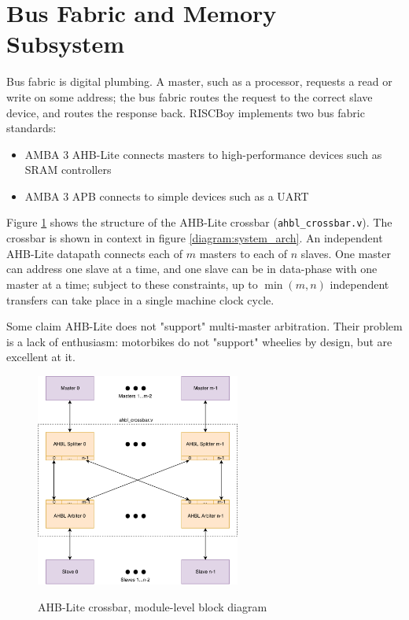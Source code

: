 \section{Bus Fabric and Memory Subsystem}

Bus fabric is digital plumbing. A master, such as a processor, requests a read or write on some address; the bus fabric routes the request to the correct slave device, and routes the response back. RISCBoy implements two bus fabric standards:

\begin{itemize}
\item AMBA 3 AHB-Lite connects masters to high-performance devices such as SRAM controllers
\item AMBA 3 APB connects to simple devices such as a UART
\end{itemize}

Figure \ref{diagram:crossbar_structure} shows the structure of the AHB-Lite crossbar ({\tt ahbl\_crossbar.v}). The crossbar is shown in context in figure \ref{diagram:system_arch}. An independent AHB-Lite datapath connects each of $m$ masters to each of $n$ slaves. One master can address one slave at a time, and one slave can be in data-phase with one master at a time; subject to these constraints, up to $\min(m,n)$ independent transfers can take place in a single machine clock cycle.

Some claim AHB-Lite does not "support" multi-master arbitration. Their problem is a lack of enthusiasm: motorbikes do not "support" wheelies by design, but are excellent at it.

\begin{figure}[!htb]
\centering
\caption{AHB-Lite crossbar, module-level block diagram} \includegraphics[width=0.6\textwidth]{diagrams/crossbar_structure.pdf}
\label{diagram:crossbar_structure}
\end{figure}

